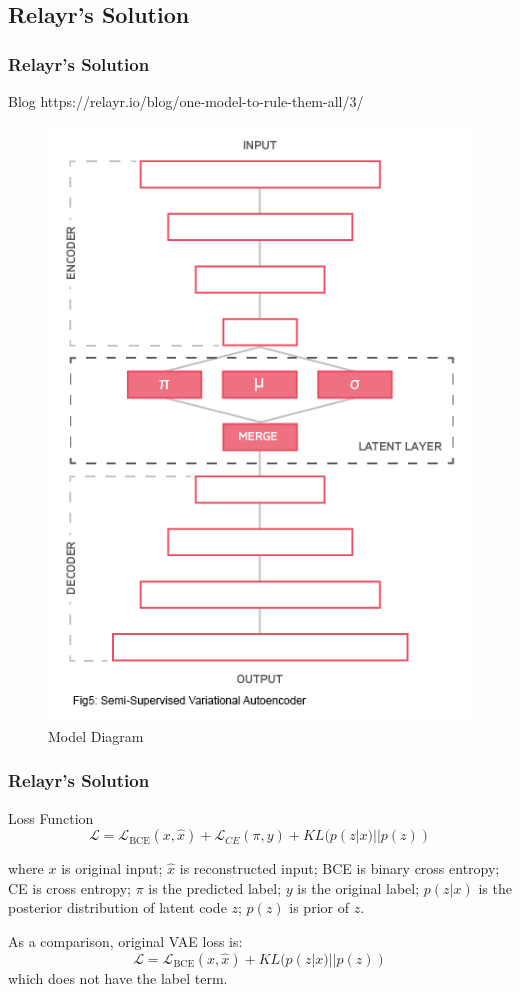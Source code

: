 \documentclass{beamer}
\begin{document}
\subsection{Relayr's Solution}
\begin{frame}
\frametitle{Relayr's Solution}
\begin{block}{Blog}
https://relayr.io/blog/one-model-to-rule-them-all/3/
\end{block}
\begin{figure}
\includegraphics[width=0.4\linewidth]{figs/relayr_diagram.png}
\caption{Model Diagram}
\end{figure}
\end{frame}

\begin{frame}
\frametitle{Relayr's Solution}
\begin{block}{Loss Function}
\[
\mathcal{L} = \mathcal{L}_{\text{BCE}}(x, \hat{x}) + \mathcal{L}_{CE}(\pi, y) + KL(p(z|x)||p(z))
\]
\end{block}
where $x$ is original input; 
$\hat{x}$ is reconstructed input; 
BCE is binary cross entropy; 
CE is cross entropy;
$\pi$ is the predicted label;
$y$ is the original label;
$p(z|x)$ is the posterior distribution of latent code $z$;
$p(z)$ is prior of $z$.

As a comparison, original VAE loss is:
\[
\mathcal{L} = \mathcal{L}_{\text{BCE}}(x, \hat{x}) + KL(p(z|x)||p(z))
\]
which does not have the label term.

\end{frame}
\end{document}
